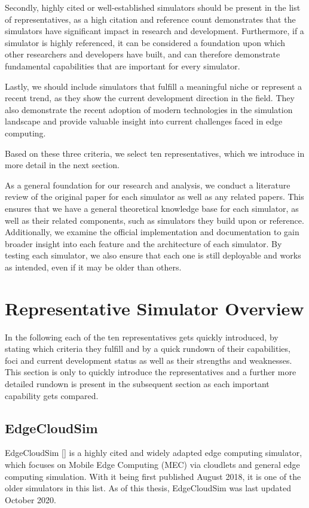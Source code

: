 Secondly, highly cited or well-established simulators should be present in the list of representatives, as a high citation and reference count demonstrates that the simulators have significant impact in research and development.
Furthermore, if a simulator is highly referenced, it can be considered a foundation upon which other researchers and developers have built, and can therefore demonstrate fundamental capabilities that are important for every simulator.

Lastly, we should include simulators that fulfill a meaningful niche or represent a recent trend, as they show the current development direction in the field.
They also demonstrate the recent adoption of modern technologies in the simulation landscape and provide valuable insight into current challenges faced in edge computing.

Based on these three criteria, we select ten representatives, which we introduce in more detail in the next section.

As a general foundation for our research and analysis, we conduct a literature review of the original paper for each simulator as well as any related papers.
This ensures that we have a general theoretical knowledge base for each simulator, as well as their related components, such as simulators they build upon or reference.
Additionally, we examine the official implementation and documentation to gain broader insight into each feature and the architecture of each simulator.
By testing each simulator, we also ensure that each one is still deployable and works as intended, even if it may be older than others.

\section{Representative Simulator Overview}
In the following each of the ten representatives gets quickly introduced, by stating which criteria they fulfill and by a quick rundown of their capabilities, foci and current development status as well as their strengths and weaknesses.
This section is only to quickly introduce the representatives and a further more detailed rundown is present in the subsequent section as each important capability gets compared.
\subsection{EdgeCloudSim}\label{sec:EdgeCloudSim}
EdgeCloudSim [\cite{sim-edgecloudsim}] is a highly cited and widely adapted edge computing simulator, which focuses on Mobile Edge Computing (MEC) via cloudlets and general edge computing simulation.
With it being first published August 2018, it is one of the older simulators in this list. As of this thesis, EdgeCloudSim was last updated October 2020.

